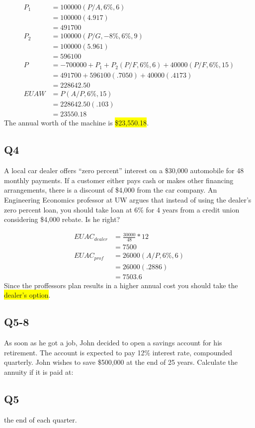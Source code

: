 \documentclass[12pt]{article}
\newcommand{\hilight}[1]{\colorbox{yellow}{#1}}
\begin{document}
\begin{align*}
P_1 &= 100000(P/A, 6\%, 6)\\
&= 100000(4.917)\\
&= 491700\\
P_2 &= 100000(P/G, -8\%, 6\%, 9)\\
&=100000(5.961)\\
&=596100\\
P &= -700000 + P_1 + P_2(P/F, 6\%, 6) + 40000(P/F, 6\%, 15)\\
&= 491700 + 596100(.7050) + 40000(.4173)\\
&= 228642.50\\
EUAW &= P(A/P, 6\%, 15)\\
&=228642.50(.103)\\
&=23550.18
\end{align*}
The annual worth of the machine is \hilight{\$23,550.18}.

\subsection*{Q4}
A local car dealer offers “zero percent” interest on a \$30,000 automobile for 48
monthly payments. If a customer either pays cash or makes other financing arrangements, there is a discount of \$4,000 from the car company. An Engineering Economics professor at UW argues that instead of using the dealer’s zero percent loan, you should take loan at 6\% for 4 years from a credit union considering \$4,000 rebate. Is he right?

\begin{align*}
EUAC_{dealer} &= \frac{30000}{48}*12\\
&= 7500\\
EUAC_{prof} &= 26000(A/P, 6\%, 6)\\
&= 26000(.2886)\\
&= 7503.6
\end{align*}
 Since the proffessors plan results in a higher annual cost you should take the \hilight{dealer's option}.

\subsection*{Q5-8}
As soon as he got a job, John decided to open a savings account for his retirement. The account is expected to pay 12\% interest rate, compounded quarterly. John wishes to save \$500,000 at the end of 25 years. Calculate the annuity if it is paid at:

\subsection*{Q5}
the end of each quarter.
\end{document}
